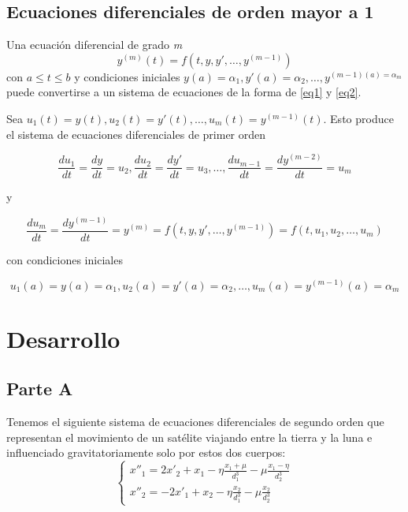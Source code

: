 \documentclass[titlepage,a4paper]{article}
\begin{document}
	\subsection{Ecuaciones diferenciales de orden mayor a 1}\cite{burden_higher_order_diff_eq}
			Una ecuación diferencial de grado \emph{m}
			\begin{equation}
				y^{(m)}(t)=f(t,y,y',\dots,y^{(m-1)})
			\end{equation}
			con $a \leq t \leq b$ y condiciones iniciales $y(a)=\alpha_{1},y'(a)=\alpha_{2},\dots,y^{(m-1)(a)=\alpha_{m}}$ 
			puede convertirse a un sistema de ecuaciones de la forma de \eqref{eq1} y \eqref{eq2}.

			Sea $u_{1}(t)=y(t),u_{2}(t)=y'(t),\dots,u_{m}(t)=y^{(m-1)}(t)$. Esto produce el sistema de ecuaciones diferenciales 
			de primer orden

			\begin{equation}
				\frac{du_{1}}{dt}=\frac{dy}{dt}=u_{2},\frac{du_{2}}{dt}=\frac{dy'}{dt}=u_{3},\dots,\frac{du_{m-1}}{dt}=\frac{dy^{(m-2)}}{dt}=u_{m}
			\end{equation}

			y

			\begin{equation}
				\frac{du_{m}}{dt}=\frac{dy^{(m-1)}}{dt}=y^{(m)}=f(t,y,y',\dots,y^{(m-1)})=f(t,u_{1},u_{2},\dots,u_{m})
			\end{equation}

			con condiciones iniciales

			\begin{equation}
				u_{1}(a)=y(a)=\alpha_{1}, u_{2}(a)=y'(a)=\alpha_{2},\dots,u_{m}(a)=y^{(m-1)}(a)=\alpha_{m}
			\end{equation}
\section{Desarrollo}\label{sec:desarrollo}
	\subsection{Parte A}\label{sec:parteA}

		Tenemos el siguiente sistema de ecuaciones diferenciales de segundo orden que representan el movimiento de un satélite
		viajando entre la tierra y la luna e influenciado gravitatoriamente solo por estos dos cuerpos:
		\begin{equation}
			\begin{cases}
				x''_{1} = 2x'_{2} + x_{1} - \eta\frac{x_{1} + \mu}{d_{1}^{3}} - \mu\frac{x_{1}-\eta}{d_{2}^{3}}\\
				x''_{2} = -2x'_{1} + x_{2} - \eta\frac{x_{2}}{d_{1}^{3}} - \mu\frac{x_{2}}{d_{2}^{3}}
			\end{cases}
		\end{equation}
\end{document}
